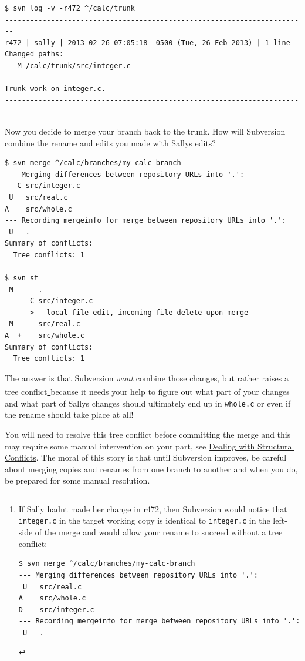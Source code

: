 \begin{verbatim}
$ svn log -v -r472 ^/calc/trunk
------------------------------------------------------------------------
r472 | sally | 2013-02-26 07:05:18 -0500 (Tue, 26 Feb 2013) | 1 line
Changed paths:
   M /calc/trunk/src/integer.c

Trunk work on integer.c.
------------------------------------------------------------------------
\end{verbatim}

Now you decide to merge your branch back to the trunk. How will
Subversion combine the rename and edits you made with
Sally\textquotesingle s edits?

\begin{verbatim}
$ svn merge ^/calc/branches/my-calc-branch
--- Merging differences between repository URLs into '.':
   C src/integer.c
 U   src/real.c
A    src/whole.c
--- Recording mergeinfo for merge between repository URLs into '.':
 U   .
Summary of conflicts:
  Tree conflicts: 1

$ svn st
 M      .
      C src/integer.c
      >   local file edit, incoming file delete upon merge
 M      src/real.c
A  +    src/whole.c
Summary of conflicts:
  Tree conflicts: 1
\end{verbatim}

The answer is that Subversion \emph{won\textquotesingle t} combine those
changes, but rather raises a tree conflict\footnote{If Sally
  hadn\textquotesingle t made her change in r472, then Subversion would
  notice that \texttt{integer.c} in the target working copy is identical
  to \texttt{integer.c} in the left-side of the merge and would allow
  your rename to succeed without a tree conflict:

\begin{Verbatim}
$ svn merge ^/calc/branches/my-calc-branch
--- Merging differences between repository URLs into '.':
 U   src/real.c
A    src/whole.c
D    src/integer.c
--- Recording mergeinfo for merge between repository URLs into '.':
 U   .
\end{Verbatim}
}because it needs your help to figure out what part of your changes and
what part of Sally\textquotesingle s changes should ultimately end up in
\texttt{whole.c} or even if the rename should take place at all!

You will need to resolve this tree conflict before committing the merge
and this may require some manual intervention on your part, see
\hyperref[svn.tour.treeconflicts]{Dealing with Structural Conflicts}.
The moral of this story is that until Subversion improves, be careful
about merging copies and renames from one branch to another and when you
do, be prepared for some manual resolution.

